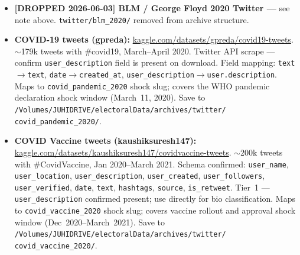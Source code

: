 \documentclass[11pt]{article}
\begin{document}
\begin{taskbox}
{\begin{itemize}[leftmargin=1.6em, itemsep=1pt]
          \smallskip
          Note: \texttt{github.com/kashish-s/TruthSocial\_2024ElectionInitiative}
          is the scraping scripts repository only --- it contains no data.
          The actual dataset is the Kaggle link above.
    \item \textbf{[DROPPED 2026-06-03] BLM / George Floyd 2020 Twitter ---}
          see note above. \texttt{twitter/blm\_2020/} removed from archive structure.
    \item \textbf{COVID-19 tweets (gpreda):}
          \url{kaggle.com/datasets/gpreda/covid19-tweets}.
          $\sim$179k tweets with \#covid19, March--April 2020. Twitter API
          scrape --- confirm \texttt{user\_description} field is present on
          download. Field mapping: \texttt{text}$\to$\texttt{text},
          \texttt{date}$\to$\texttt{created\_at},
          \texttt{user\_description}$\to$\texttt{user.description}.
          Maps to \texttt{covid\_pandemic\_2020} shock slug; covers the WHO
          pandemic declaration shock window (March~11, 2020).
          Save to \texttt{/Volumes/JUHIDRIVE/electoralData/archives/twitter/}\allowbreak
          \texttt{covid\_pandemic\_2020/}.
    \item \textbf{COVID Vaccine tweets (kaushiksuresh147):}
          \url{kaggle.com/datasets/kaushiksuresh147/covidvaccine-tweets}.
          $\sim$200k tweets with \#CovidVaccine, Jan 2020--March 2021.
          Schema confirmed: \texttt{user\_name}, \texttt{user\_location},
          \texttt{user\_description}, \texttt{user\_created},
          \texttt{user\_followers}, \texttt{user\_verified}, \texttt{date},
          \texttt{text}, \texttt{hashtags}, \texttt{source},
          \texttt{is\_retweet}. Tier~1 --- \texttt{user\_description}
          confirmed present; use directly for bio classification.
          Maps to \texttt{covid\_vaccine\_2020} shock slug; covers vaccine
          rollout and approval shock window (Dec~2020--March~2021).
          Save to \texttt{/Volumes/JUHIDRIVE/electoralData/archives/twitter/}\allowbreak
          \texttt{covid\_vaccine\_2020/}.
  \end{itemize}

}
\end{taskbox}
\end{document}
